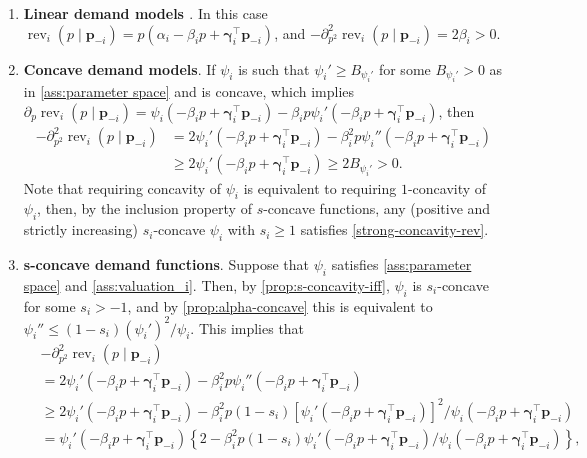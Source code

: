 \documentclass{article} %
\begin{document}
\begin{enumerate}[leftmargin=*, label=(\arabic*)]
\item {\bf Linear demand models \citep{li2024lego}}. In this case $\operatorname{rev}_i(p \mid \mathbf{p}_{-i}) = p(\alpha_i -\beta_i p +\boldsymbol{\gamma}_i^{\top}\mathbf{p}_{-i})$, and $-\partial^2_{p^2}\operatorname{rev}_i(p \mid \mathbf{p}_{-i}) = 2\beta_i>0$.
\item {\bf Concave demand models}. If $\psi_i$ is such that $\psi_i'\geq B_{\psi_i'}$ for some $B_{\psi_i'}>0$ as in \cref{ass:parameter space} and is concave, which implies $\partial_{p}\operatorname{rev}_i(p \mid \mathbf{p}_{-i}) = \psi_{i}(-\beta_i p + \boldsymbol{\gamma}_i^{\top}\mathbf{p}_{-i}) -\beta_i p \psi_{i}'(-\beta_i p + \boldsymbol{\gamma}_i^{\top}\mathbf{p}_{-i})$, then 
\begin{align*}
-\partial_{p^2}^2\operatorname{rev}_i(p \mid \mathbf{p}_{-i}) &= 2\psi_{i}'(-\beta_i p + \boldsymbol{\gamma}_i^{\top}\mathbf{p}_{-i}) -\beta_i^2 p \psi_{i}''(-\beta_i p + \boldsymbol{\gamma}_i^{\top}\mathbf{p}_{-i}) \\
&\geq 2\psi_{i}'(-\beta_i p + \boldsymbol{\gamma}_i^{\top}\mathbf{p}_{-i}) \geq 2B_{\psi_i'}>0.
\end{align*}
Note that requiring concavity of $\psi_i$ is equivalent to requiring $1$-concavity of $\psi_i$, then, by the inclusion property of $s$-concave functions, any (positive and strictly increasing) $s_i$-concave $\psi_i$ with $s_i \geq 1$ satisfies \cref{strong-concavity-rev}.
\item {\bf s-concave demand functions}. Suppose that $\psi_i$ satisfies \cref{ass:parameter space} and \cref{ass:valuation_i}. Then, by \cref{prop:s-concavity-iff}, $\psi_i$ is $s_i$-concave for some $s_i>-1$, and by \cref{prop:alpha-concave} this is equivalent to $\psi_i'' \leq (1-s_i)(\psi_i')^2/\psi_i$. This implies that
\begin{align*}
&-\partial_{p^2}^2\operatorname{rev}_i(p \mid \mathbf{p}_{-i}) \\
&= 2\psi_{i}'(-\beta_i p + \boldsymbol{\gamma}_i^{\top}\mathbf{p}_{-i}) -\beta_i^2 p \psi_{i}''(-\beta_i p + \boldsymbol{\gamma}_i^{\top}\mathbf{p}_{-i}) \\
&\geq 2\psi_{i}'(-\beta_i p + \boldsymbol{\gamma}_i^{\top}\mathbf{p}_{-i}) -\beta_i^2 p (1-s_i)[\psi_{i}'(-\beta_i p + \boldsymbol{\gamma}_i^{\top}\mathbf{p}_{-i})]^2/\psi_{i}(-\beta_i p + \boldsymbol{\gamma}_i^{\top}\mathbf{p}_{-i})\\
&= \psi_{i}'(-\beta_i p + \boldsymbol{\gamma}_i^{\top}\mathbf{p}_{-i})\left\{2 -\beta_i^2 p (1-s_i)\psi_{i}'(-\beta_i p + \boldsymbol{\gamma}_i^{\top}\mathbf{p}_{-i})/\psi_{i}(-\beta_i p + \boldsymbol{\gamma}_i^{\top}\mathbf{p}_{-i})\right\},

\end{align*}
\end{enumerate}
\end{document}
